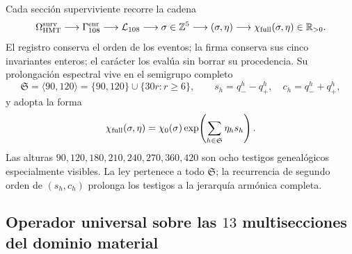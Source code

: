 Cada sección superviviente recorre la cadena
\begin{equation}
 \Omega_{\rm HMT}^{\rm surv}
 \longrightarrow\Gamma_{108}^{\rm enr}
 \longrightarrow\mathcal L_{108}
 \longrightarrow\sigma\in\mathbb Z^5
 \longrightarrow(\sigma,\eta)
 \longrightarrow\chi_{\rm full}(\sigma,\eta)\in\mathbb R_{>0}.
 \label{eq:cadena-genealogica-ley-masa-autonoma}
\end{equation}
El registro conserva el orden de los eventos; la firma conserva sus cinco
invariantes enteros; el carácter los evalúa sin borrar su procedencia. Su
prolongación espectral vive en el semigrupo completo
\begin{equation}
 \mathfrak S=\langle90,120\rangle
 =\{90,120\}\cup\{30r:r\ge6\},
 \qquad
 s_h=q_-^h-q_+^h,
 \quad c_h=q_-^h+q_+^h,
 \label{eq:semigrupo-global-masas-autonoma}
\end{equation}
y adopta la forma
\begin{equation}
 \chi_{\rm full}(\sigma,\eta)
 =\chi_0(\sigma)
  \exp\!\left(\sum_{h\in\mathfrak S}\eta_hs_h\right).
 \label{eq:caracter-completo-masas-autonoma}
\end{equation}
Las alturas \(90,120,180,210,240,270,360,420\) son ocho testigos
genealógicos especialmente visibles. La ley pertenece a todo
\(\mathfrak S\); la recurrencia de segundo orden de \((s_h,c_h)\) prolonga
los testigos a la jerarquía armónica completa.

\subsection{Operador universal sobre las \(13\) multisecciones del dominio material}

